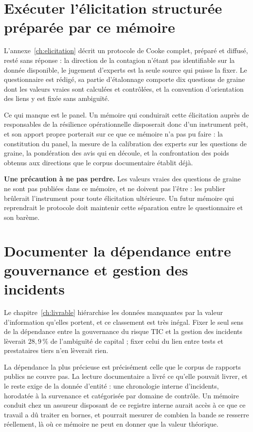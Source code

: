 \section{Exécuter l'élicitation structurée préparée par ce mémoire}

L'annexe~\ref{ch:elicitation} décrit un protocole de Cooke complet, préparé et diffusé, resté
sans réponse : la direction de la contagion n'étant pas identifiable sur la donnée disponible, le
jugement d'experts est la seule source qui puisse la fixer. Le questionnaire est rédigé, sa partie d'étalonnage
comporte dix questions de graine dont les valeurs vraies sont calculées et contrôlées, et la
convention d'orientation des liens y est fixée sans ambiguïté.

Ce qui manque est le panel. Un mémoire qui conduirait cette élicitation auprès de responsables de
la résilience opérationnelle disposerait donc d'un instrument prêt, et son apport propre porterait
sur ce que ce mémoire n'a pas pu faire : la constitution du panel, la mesure de la calibration des
experts sur les questions de graine, la pondération des avis qui en découle, et la confrontation
des poids obtenus aux directions que le corpus documentaire établit déjà.

\begin{attention}
\textbf{Une précaution à ne pas perdre.} Les valeurs vraies des questions de graine ne sont pas
publiées dans ce mémoire, et ne doivent pas l'être : les publier brûlerait l'instrument pour toute
élicitation ultérieure. Un futur mémoire qui reprendrait le protocole doit maintenir cette
séparation entre le questionnaire et son barème.
\end{attention}

\section{Documenter la dépendance entre gouvernance et gestion des incidents}

Le chapitre~\ref{ch:livrable} hiérarchise les données manquantes par la valeur d'information
qu'elles portent, et ce classement est très inégal. Fixer le seul sens de la dépendance entre la
gouvernance du risque TIC et la gestion des incidents lèverait $28{,}9\,\%$ de
l'ambiguïté de capital ; fixer celui du lien entre tests et prestataires tiers n'en lèverait rien.

La dépendance la plus précieuse est précisément celle que le corpus de rapports publics ne couvre
pas. La lecture documentaire a livré ce qu'elle pouvait livrer, et le reste exige de la donnée
d'entité : une chronologie interne d'incidents, horodatée à la survenance et catégorisée par
domaine de contrôle. Un mémoire conduit chez un assureur disposant de ce registre interne aurait
accès à ce que ce travail a dû traiter en bornes, et pourrait mesurer de combien la bande se
resserre réellement, là où ce mémoire ne peut en donner que la valeur théorique.

